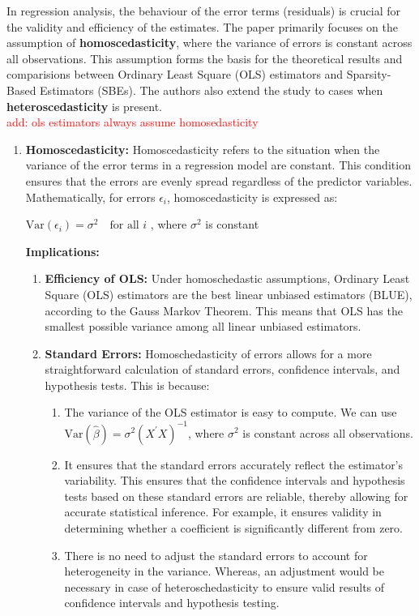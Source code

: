 In regression analysis, the behaviour of the error terms (residuals) is crucial for the validity and efficiency of the estimates. The paper primarily focuses on the assumption of \textbf{homoscedasticity}, where the variance of errors is constant across all observations. This assumption forms the basis for the theoretical results and comparisions between Ordinary Least Square (OLS) estimators and Sparsity-Based Estimators (SBEs). The authors also extend the study to cases when \textbf{heteroscedasticity} is present.\\
\textcolor{red}{add: ols estimators always assume homosedasticity}
\begin{enumerate}
\item \textbf{Homoscedasticity:} Homoscedasticity refers to the situation when the variance of the error terms in a regression model are constant. This condition ensures that the errors are evenly spread regardless of the predictor variables. Mathematically, for errors $\epsilon_i$, homoscedasticity is expressed as:
\begin{center}
    $\text{Var}(\epsilon_i) = \sigma^2 \quad \text{for all } i$ , where  $\sigma^2$ is constant
\end{center}
\textbf{Implications:}
\begin{enumerate}
    \item \textbf{Efficiency of OLS:} Under homoschedastic assumptions, Ordinary Least Square (OLS) estimators are the best linear unbiased estimators (BLUE), according to the Gauss Markov Theorem. This means that OLS has the smallest possible variance among all linear unbiased estimators. 
    \item \textbf{Standard Errors:} Homoschedasticity of errors allows for a more straightforward calculation of standard errors, confidence intervals, and hypothesis tests. This is because:
    \begin{enumerate}
        \item The variance of the OLS estimator is easy to compute. We can use $\text{Var}(\hat{\beta}) = \sigma^2 (X^{\prime}X)^{-1}$, where $\sigma^2$ is constant across all observations.    
        \item It ensures that the standard errors accurately reflect the estimator's variability. This ensures that the confidence intervals and hypothesis tests based on these standard errors are reliable, thereby allowing for accurate statistical inference. For example, it ensures validity in determining whether a coefficient is significantly different from zero. 
        \item There is no need to adjust the standard errors to account for heterogeneity in the variance. Whereas, an adjustment would be necessary in case of heteroschedasticity to ensure valid results of confidence intervals and hypothesis testing.
    \end{enumerate}
\end{enumerate}


\end{enumerate}
